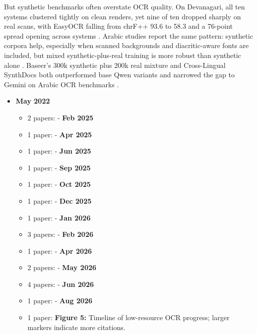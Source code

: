     
    But synthetic benchmarks often overstate OCR quality. On Devanagari, all ten systems clustered tightly on clean renders, yet nine of ten dropped sharply on real scans, with EasyOCR falling from chrF++ 93.6 to 58.3 and a 76-point spread opening across systems  \cite{Singh2026Can}. Arabic studies report the same pattern: synthetic corpora help, especially when scanned backgrounds and diacritic-aware fonts are included, but mixed synthetic-plus-real training is more robust than synthetic alone  \cite{Alhomoud2025Cross-Lingual} \cite{Hennara2025Baseer:}. Baseer’s 300k synthetic plus 200k real mixture and Cross-Lingual SynthDocs both outperformed base Qwen variants and narrowed the gap to Gemini on Arabic OCR benchmarks  \cite{Hennara2025Baseer:} \cite{Alhomoud2025Cross-Lingual}.
    
    
    \begin{itemize}
    \item \textbf{May 2022}\begin{itemize}
    \item 2 papers:  \cite{Mathew2022Towards} \cite{Saini2022OCR}- \textbf{Feb 2025}
    \item 1 paper:  \cite{Heakl2025KITAB-Bench:}- \textbf{Apr 2025}
    \item 1 paper:  \cite{Bourne2025Scrambled}- \textbf{Jun 2025}
    \item 1 paper:  \cite{Wasfy2025QARI-OCR:}- \textbf{Sep 2025}
    \item 1 paper:  \cite{Hennara2025Baseer:}- \textbf{Oct 2025}
    \item 1 paper:  \cite{Alhomoud2025Cross-Lingual}- \textbf{Dec 2025}
    \item 1 paper:  \cite{Manna2025Label-Free}- \textbf{Jan 2026}
    \item 3 papers:  \cite{Elkousy2026Domain-Specific} \cite{Taghadouini2026LightOnOCR:} \cite{Malik2026synthocr-gen:}- \textbf{Feb 2026}
    \item 1 paper:  \cite{Faraz2026Designing}- \textbf{Apr 2026}
    \item 2 papers:  \cite{Kargaran2026GlotOCR} \cite{Momayiz2026AtlasOCR:}- \textbf{May 2026}
    \item 4 papers:  \cite{Heakl2026DocAtlas:} \cite{Xu2026Multilingual} \cite{Al-Azzawi2026Cross-Lingual} \cite{Al-Azzawi2026Understanding}- \textbf{Jun 2026}
    \item 1 paper:  \cite{Singh2026Can}- \textbf{Aug 2026}
    \item 1 paper:  \cite{Achyuth2026What}\textbf{Figure 5:} Timeline of low-resource OCR progress; larger markers indicate more citations.
    \end{itemize}
    
    
    \end{itemize}
    
